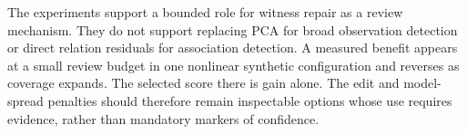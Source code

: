 The experiments support a bounded role for witness repair as a review mechanism. They do not support replacing PCA for broad observation detection or direct relation residuals for association detection. A measured benefit appears at a small review budget in one nonlinear synthetic configuration and reverses as coverage expands. The selected score there is gain alone. The edit and model-spread penalties should therefore remain inspectable options whose use requires evidence, rather than mandatory markers of confidence.
